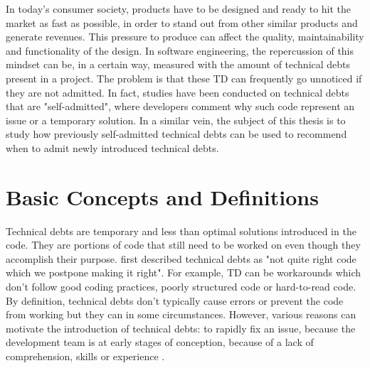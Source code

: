 

\label{sec:Introduction}  


\setlength{\parindent}{5ex} In today's consumer society, products have to be designed and ready to hit the market as fast as possible, in order to stand out from other similar products and generate revenues. This pressure to produce can affect the quality, maintainability and functionality of the design. In software engineering, the repercussion of this mindset can be, in a certain way, measured with the amount of technical debts present in a project. The problem is that these \ac{TD} can frequently go unnoticed if they are not admitted. In fact, studies have been conducted on technical debts that are "self-admitted", where developers comment why such code represent an issue or a temporary solution. In a similar vein, the subject of this thesis is to study how previously self-admitted technical debts can be used to recommend when to admit newly introduced technical debts.

\section{Basic Concepts and Definitions}  


\setlength{\parindent}{5ex} Technical debts are temporary and less than optimal solutions introduced in the code. They are portions of code that still need to be worked on even though they accomplish their purpose. \citet{Cunningham:1992:WPM:157709.157715} first described technical debts as "not quite right code which we postpone making it right". For example, \ac{TD} can be workarounds which don't follow good coding practices, poorly structured code or hard-to-read code. By definition, technical debts don't typically cause errors or prevent the code from working but they can in some circumstances. However, various reasons can motivate the introduction of technical debts: to rapidly fix an issue, because the development team is at early stages of conception, because of a lack of comprehension, skills or experience \citep{Suryanarayana20151}. \par

